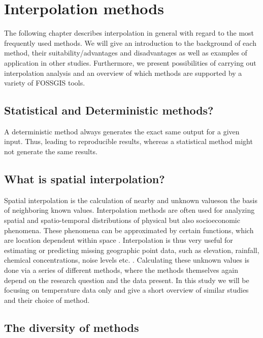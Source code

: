 
\section{Interpolation methods}

The following chapter describes interpolation in general with regard to the most frequently used methods. We will give an introduction to the background of each method, their suitability/advantages and disadvantages as well as examples of application in other studies. Furthermore, we present possibilities of carrying out interpolation analysis and an overview of which methods are supported by a variety of FOSSGIS tools.


\subsection{Statistical and Deterministic methods?}

A deterministic method always generates the exact same output for a given input. Thus, leading to reproducible results, whereas a statistical method might not generate the same results.

\subsection{What is spatial interpolation?}

Spatial interpolation is the calculation of nearby and unknown values ​​on the basis of neighboring known values. \cite{gitta_raumliche_2016} Interpolation methods are often used for analyzing spatial and spatio-temporal distributions of physical but also socioeconomic phenomena. These phenomena can be approximated by certain functions, which are location dependent within space \cite{mitas_spatial_1999}. Interpolation is thus very useful for estimating or predicting missing geographic point data, such as elevation, rainfall, chemical concentrations, noise levels etc. \cite{samanta_interpolation_2012}. Calculating these unknown values is done via a series of different methods, where the methods themselves again depend on the research question and the data present. In this study we will be focusing on temperature data only and give a short overview of similar studies and their choice of method.

\subsection{The diversity of methods}

